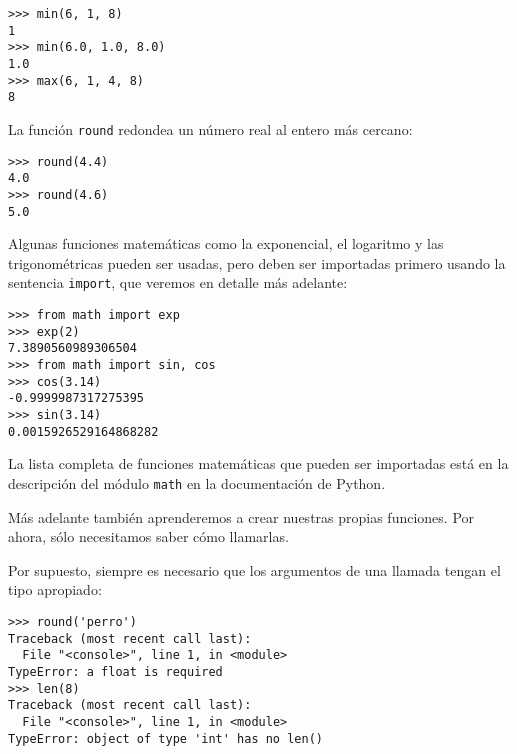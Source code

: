\begin{lstlisting}
>>> min(6, 1, 8)
1
>>> min(6.0, 1.0, 8.0)
1.0
>>> max(6, 1, 4, 8)
8
\end{lstlisting}

La función \lstinline!round! redondea un número real al entero más
cercano:

\begin{lstlisting}
>>> round(4.4)
4.0
>>> round(4.6)
5.0
\end{lstlisting}

Algunas funciones matemáticas como la exponencial, el logaritmo y las
trigonométricas pueden ser usadas, pero deben ser importadas primero
usando la sentencia \lstinline!import!, que veremos en detalle más
adelante:

\begin{lstlisting}
>>> from math import exp
>>> exp(2)
7.3890560989306504
>>> from math import sin, cos
>>> cos(3.14)
-0.9999987317275395
>>> sin(3.14)
0.0015926529164868282
\end{lstlisting}

La lista completa de funciones matemáticas que pueden ser importadas
está en la descripción
del módulo \lstinline!math! en la documentación de Python.

Más adelante también aprenderemos a crear nuestras propias funciones.
Por ahora, sólo necesitamos saber cómo llamarlas.

Por supuesto, siempre es necesario que los argumentos de una llamada
tengan el tipo apropiado:

\begin{lstlisting}
>>> round('perro')
Traceback (most recent call last):
  File "<console>", line 1, in <module>
TypeError: a float is required
>>> len(8)
Traceback (most recent call last):
  File "<console>", line 1, in <module>
TypeError: object of type 'int' has no len()
\end{lstlisting}

